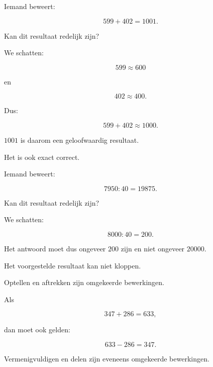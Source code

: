 \documentclass{ximera}
\begin{document}
\begin{oefening}{\oefU\ESS}
\begin{question}
Iemand beweert:

\[
599+402=1001.
\]

Kan dit resultaat redelijk zijn?

\begin{oplossing}

We schatten:

\[
599\approx600
\]

en

\[
402\approx400.
\]

Dus:

\[
599+402\approx1000.
\]

\(1001\) is daarom een geloofwaardig resultaat.

Het is ook exact correct.

\end{oplossing}

\end{question}


\begin{question}

Iemand beweert:

\[
7950:40=19875.
\]

Kan dit resultaat redelijk zijn?

\begin{oplossing}

We schatten:

\[
8000:40=200.
\]

Het antwoord moet dus ongeveer \(200\) zijn en niet ongeveer \(20000\).

Het voorgestelde resultaat kan niet kloppen.

\end{oplossing}

\end{question}

\end{oefening}




Optellen en aftrekken zijn omgekeerde bewerkingen.

Als

\[
347+286=633,
\]

dan moet ook gelden:

\[
633-286=347.
\]

Vermenigvuldigen en delen zijn eveneens omgekeerde bewerkingen.
\end{document}

